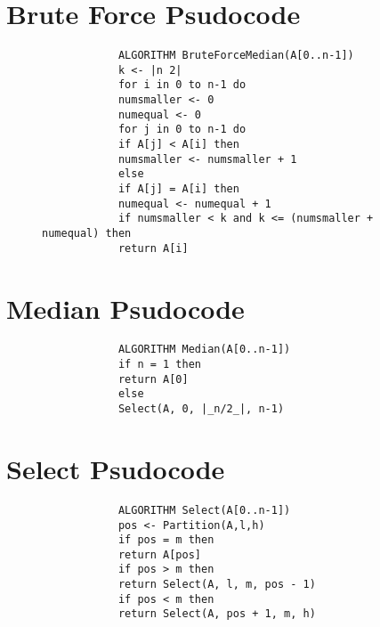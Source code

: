 \documentclass[a4paper,12pt]{article} %
\begin{document}
	\newpage
	\begin{appendices}
		\section{Brute Force Psudocode}
		\begin{figure}[h]
			\begin{lstlisting}
			ALGORITHM BruteForceMedian(A[0..n-1])
			k <- |n 2|
			for i in 0 to n-1 do
			numsmaller <- 0
			numequal <- 0 
			for j in 0 to n-1 do
			if A[j] < A[i] then
			numsmaller <- numsmaller + 1
			else
			if A[j] = A[i] then
			numequal <- numequal + 1
			if numsmaller < k and k <= (numsmaller + numequal) then
			return A[i]
			\end{lstlisting}
			\caption{\label{Brute Force Psudocode} }
		\end{figure}
		
		\newpage
		
		
		
		\section{Median Psudocode}
		\begin{figure}[h]
			\begin{lstlisting}
			ALGORITHM Median(A[0..n-1])
			if n = 1 then
			return A[0]
			else
			Select(A, 0, |_n/2_|, n-1)
			\end{lstlisting}
			\caption{\label{Median Psudocode} }
		\end{figure}
		
		
		\section{Select Psudocode}
		\begin{figure}[h]
			\begin{lstlisting}
			ALGORITHM Select(A[0..n-1])
			pos <- Partition(A,l,h)
			if pos = m then
			return A[pos]
			if pos > m then
			return Select(A, l, m, pos - 1)
			if pos < m then
			return Select(A, pos + 1, m, h)
			\end{lstlisting}
			\caption{\label{Select Psudocode} }
		\end{figure}
		\newpage
		

\end{appendices}
\end{document}
